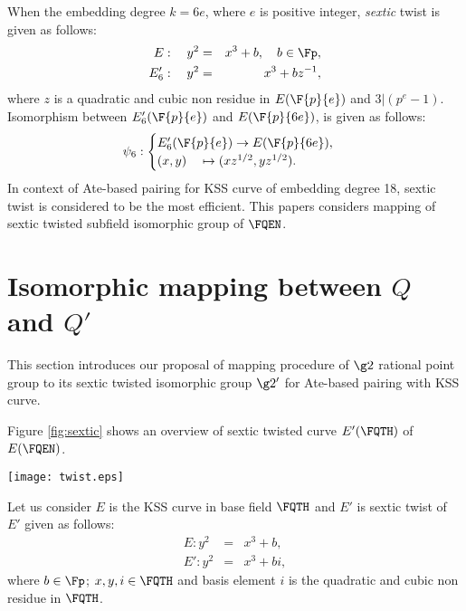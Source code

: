         When the embedding degree $k = 6e$, where $e$ is positive integer, \textit{sextic} twist is given as follows:
        \begin{eqnarray}
        E:  \quad y^2 & = & x^3+b, \quad b \in \Fp, \\
        E'_6: \quad y^2 & =  & x^3+bz^{-1},
        \end{eqnarray}  
        where $z$ is a quadratic and cubic non residue in $E(\F{p}{e})$ and $3|(p^e-1)$.  Isomorphism between $E'_6(\F{p}{e})$ and $E(\F{p}{6e})$, is given as follows:
        \begin{eqnarray}
        \psi_6 : \begin{cases}
        E'_6(\F{p}{e}) \rightarrow E(\F{p}{6e}),\\
        (x,y) \quad \mapsto (xz^{1/2},yz^{1/2}).
        \end{cases}
        \end{eqnarray}
        In context of Ate-based pairing for KSS curve of embedding degree 18, sextic twist is considered to be the most efficient. This papers considers mapping of sextic twisted subfield isomorphic group of $\FQEN$. 
        
        \section{Isomorphic mapping between $Q$ and $Q'$}
        This section introduces our proposal of mapping procedure of $\g2$ rational point group to its sextic twisted isomorphic group $\g2'$ for Ate-based pairing with KSS curve. 
        
        Figure \ref{fig:sextic} shows an overview of sextic twisted curve $E'(\FQTH)$ of $E(\FQEN)$.
        \begin{figure*}
        \centering
        \texttt{[image: twist.eps]}
        \caption{\textit{sextic twist} in KSS curve.}
        \label{fig:sextic}
        \end{figure*}
        Let us consider $E$ is the KSS curve in base field $\FQTH$  and $E'$ is sextic twist of $E'$ given as follows: 
        \begin{eqnarray}
        E:y^2 & = &x^3+b,\\
        E':y^2 & = & x^3+bi, \label{eq:KSS_Twist}
        \end{eqnarray}
        where $b \in \Fp$; $x, y, i \in \FQTH$ and basis element $i$ is the quadratic and cubic non residue in $\FQTH$.
        
